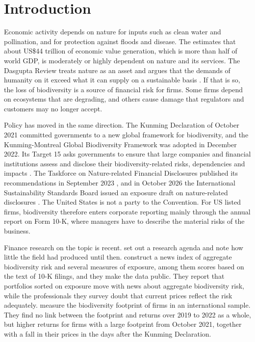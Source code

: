 \documentclass[12pt,a4paper]{article}
\begin{document}
\section{Introduction}

Economic activity depends on nature for inputs such as clean water and pollination, and for protection against floods and disease. The \citet{wef2020} estimates that about US\$44 trillion of economic value generation, which is more than half of world GDP, is moderately or highly dependent on nature and its services. The Dasgupta Review treats nature as an asset and argues that the demands of humanity on it exceed what it can supply on a sustainable basis \citep{dasgupta2021}. If that is so, the loss of biodiversity is a source of financial risk for firms. Some firms depend on ecosystems that are degrading, and others cause damage that regulators and customers may no longer accept.

Policy has moved in the same direction. The Kunming Declaration of October 2021 committed governments to a new global framework for biodiversity, and the Kunming-Montreal Global Biodiversity Framework was adopted in December 2022. Its Target 15 asks governments to ensure that large companies and financial institutions assess and disclose their biodiversity-related risks, dependencies and impacts \citep{cbd2022}. The Taskforce on Nature-related Financial Disclosures published its recommendations in September 2023 \citep{tnfd2023}, and in October 2026 the International Sustainability Standards Board issued an exposure draft on nature-related disclosures \citep{issb2026}. The United States is not a party to the Convention. For US listed firms, biodiversity therefore enters corporate reporting mainly through the annual report on Form 10-K, where managers have to describe the material risks of the business.

Finance research on the topic is recent. \citet{karolyi2023} set out a research agenda and note how little the field had produced until then. \citet{giglio2026} construct a news index of aggregate biodiversity risk and several measures of exposure, among them scores based on the text of 10-K filings, and they make the data public. They report that portfolios sorted on exposure move with news about aggregate biodiversity risk, while the professionals they survey doubt that current prices reflect the risk adequately. \citet{garel2024} measure the biodiversity footprint of firms in an international sample. They find no link between the footprint and returns over 2019 to 2022 as a whole, but higher returns for firms with a large footprint from October 2021, together with a fall in their prices in the days after the Kunming Declaration.
\end{document}

